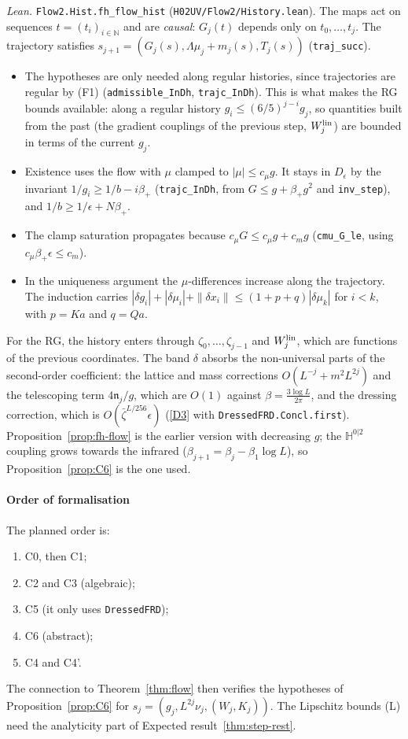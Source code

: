 \documentclass[11pt]{amsart}
\theoremstyle{definition}
\theoremstyle{remark}
\numberwithin{equation}{section}
\newcommand{\bbH}{\mathbb{H}}
\begin{document}
\noindent\emph{Lean.} \texttt{Flow2.Hist.fh\_flow\_hist} (\texttt{H02UV/Flow2/History.lean}). The maps act
on sequences $t=(t_i)_{i\in\mathbb N}$ and are \emph{causal}: $G_j(t)$ depends only on $t_0,\dots,t_j$.
The trajectory satisfies $s_{j+1}=(G_j(s),\Lambda\mu_j+m_j(s),T_j(s))$ (\texttt{traj\_succ}).
\begin{itemize}
\item The hypotheses are only needed along regular histories, since trajectories are regular by
  (F1) (\texttt{admissible\_InDh}, \texttt{trajc\_InDh}). This is what makes the RG bounds
  available: along a regular history $g_i\le(6/5)^{j-i}g_j$, so quantities built from the past
  (the gradient couplings of the previous step, $W^{\rm lin}_j$) are bounded in terms of the current
  $g_j$.
\item Existence uses the flow with $\mu$ clamped to $|\mu|\le c_\mu g$. It stays in $D_\epsilon$ by the
  invariant $1/g_i\ge1/b-i\beta_+$ (\texttt{trajc\_InDh}, from $G\le g+\beta_+g^2$ and
  \texttt{inv\_step}), and $1/b\ge1/\epsilon+N\beta_+$.
\item The clamp saturation propagates because $c_\mu G\le c_\mu g+c_mg$ (\texttt{cmu\_G\_le}, using
  $c_\mu\beta_+\epsilon\le c_m$).
\item In the uniqueness argument the $\mu$-differences increase along the trajectory. The induction
  carries $|\delta g_i|+|\delta\mu_i|+\|\delta x_i\|\le(1+p+q)|\delta\mu_k|$ for $i<k$, with $p=Ka$ and
  $q=Qa$.
\end{itemize}
For the RG, the history enters through $\zeta_0,\dots,\zeta_{j-1}$ and $W^{\rm lin}_j$, which are
functions of the previous coordinates. The band $\delta$ absorbs the non-universal parts of the
second-order coefficient: the lattice and mass corrections $O(L^{-j}+m^2L^{2j})$ and the
telescoping term $4\mathfrak n_j/g$, which are $O(1)$ against $\beta=\frac{3\log L}{2\pi}$, and the
dressing correction, which is $O(\bar\zeta^{L/256}\epsilon)$ (\ref{D3} with
\texttt{DressedFRD.Concl.first}). Proposition~\ref{prop:fh-flow} is the earlier version with
decreasing $g$; the $\bbH^{0|2}$ coupling grows towards the infrared
($\beta_{j+1}=\beta_j-\beta_1\log L$), so Proposition~\ref{prop:C6} is the one used.

\paragraph{Order of formalisation}
The planned order is:
\begin{enumerate}
\item C0, then C1;
\item C2 and C3 (algebraic);
\item C5 (it only uses \texttt{DressedFRD});
\item C6 (abstract);
\item C4 and C4'.
\end{enumerate}
The connection to Theorem~\ref{thm:flow} then verifies the hypotheses of
Proposition~\ref{prop:C6} for $s_j=(g_j,L^{2j}\nu_j,(W_j,K_j))$. The Lipschitz bounds (L) need
the analyticity part of Expected result~\ref{thm:step-rest}.
\end{document}
